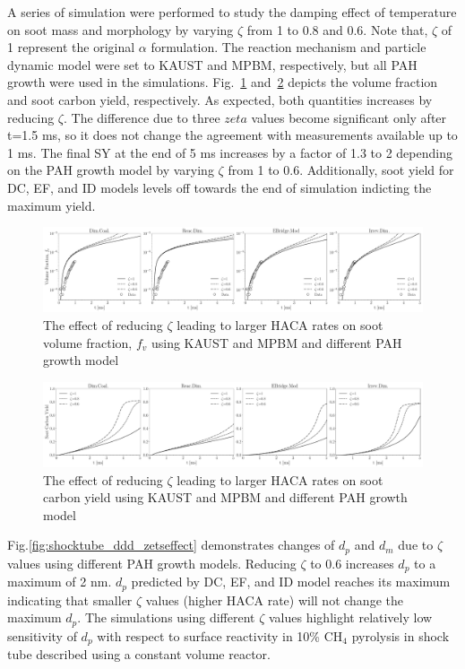 A series of simulation were performed to study the damping effect of temperature on soot mass and morphology by varying   $\zeta$ from 1 to 0.8 and 0.6. Note that, $\zeta$ of 1 represent the original $\alpha$ formulation. The reaction mechanism and particle dynamic model were set to KAUST and MPBM, respectively, but all PAH growth were used in the simulations.
Fig.~\ref{fig:shocktube_vf_zetseffect} and~\ref{fig:shocktube_sy_zetseffect} depicts the volume fraction and soot carbon yield, respectively. As expected, both quantities increases by reducing $\zeta$. The difference due to three $zeta$ values become significant only after t=1.5 ms, so it does not change the agreement with measurements available up to 1 ms. The final SY at the end of 5 ms increases by a factor of 1.3 to 2 depending on the PAH growth model by varying $\zeta$ from 1 to 0.6. Additionally, soot yield for DC, EF, and ID models levels off towards the end of simulation indicting the maximum yield.

\begin{figure}[H]
	\centering
	\includegraphics[width=1\textwidth]{Figures/Results/Shocktube/Stanford/TEM/vf_all_zetaeffect.pdf}
	\caption{The effect of reducing $\zeta$ leading to larger HACA rates on soot volume fraction, $f_v$ using KAUST and MPBM and different PAH growth model}
	\label{fig:shocktube_vf_zetseffect} 
\end{figure}


\begin{figure}[H]
	\centering
	\includegraphics[width=1\textwidth]{Figures/Results/Shocktube/Stanford/TEM/sy_all_zetaeffect.pdf}
	\caption{The effect of reducing $\zeta$ leading to larger HACA rates on soot carbon yield using KAUST and MPBM and different PAH growth model}
	\label{fig:shocktube_sy_zetseffect} 
\end{figure}

Fig.\ref{fig:shocktube_ddd_zetseffect} demonstrates changes of $d_p$ and $d_m$ due to $\zeta$ values using different PAH growth models. Reducing $\zeta$ to 0.6 increases $d_p$ to a maximum of 2 nm. $d_p$ predicted by DC, EF, and ID model reaches its maximum indicating that smaller $\zeta$ values (higher HACA rate) will not change the maximum $d_p$. The simulations using different $\zeta$ values highlight relatively low sensitivity of $d_p$ with respect to surface reactivity in 10\% $\mathrm{CH_4}$ pyrolysis in shock tube described using a constant volume reactor.

